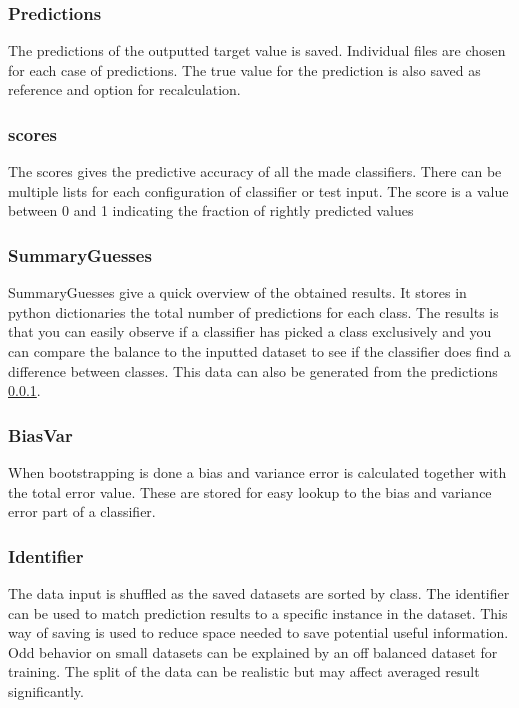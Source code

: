 \documentclass[a4paper,10pt]{article}
\begin{document}
\subsubsection{Predictions}\label{pred}
The predictions of the outputted target value is saved. Individual files are chosen for each case of predictions. The true value for the prediction is also saved as reference and option for recalculation. 

\subsubsection{scores}
The scores gives the predictive accuracy of all the made classifiers. There can be multiple lists for each configuration of classifier or test input. The score is a value between 0 and 1 indicating the fraction of rightly predicted values

\subsubsection{SummaryGuesses}
SummaryGuesses give a quick overview of the obtained results. It stores in python dictionaries the total number of predictions for each class. The results is that you can easily observe if a classifier has picked a class exclusively and you can compare the balance to the inputted dataset to see if the classifier does find a difference between classes. This data can also be generated from the predictions \ref{pred}.

\subsubsection{BiasVar}
When bootstrapping is done a bias and variance error is calculated together with the total error value. These are stored for easy lookup to the bias and variance error part of a classifier.

\subsubsection{Identifier}
The data input is shuffled as the saved datasets are sorted by class. The identifier can be used to match prediction results to a specific instance in the dataset. This way of saving is used to reduce space needed to save potential useful information. Odd behavior on small datasets can be explained by an off balanced dataset for training. The split of the data can be realistic but may affect averaged result significantly. 
\end{document}
